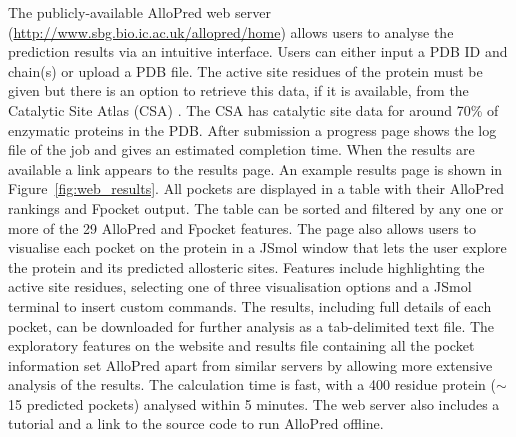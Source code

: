 The publicly-available AlloPred web server (\url{http://www.sbg.bio.ic.ac.uk/allopred/home}) allows users to analyse the prediction results via an intuitive interface.
Users can either input a PDB ID and chain(s) or upload a PDB file.
The active site residues of the protein must be given but there is an option to retrieve this data, if it is available, from the Catalytic Site Atlas (CSA) \cite{Furnham2014}.
The CSA has catalytic site data for around 70\% of enzymatic proteins in the PDB.
After submission a progress page shows the log file of the job and gives an estimated completion time.
When the results are available a link appears to the results page.
An example results page is shown in Figure~\ref{fig:web_results}.
All pockets are displayed in a table with their AlloPred rankings and Fpocket output.
The table can be sorted and filtered by any one or more of the 29 AlloPred and Fpocket features.
The page also allows users to visualise each pocket on the protein in a JSmol window that lets the user explore the protein and its predicted allosteric sites.
Features include highlighting the active site residues, selecting one of three visualisation options and a JSmol terminal to insert custom commands.
The results, including full details of each pocket, can be downloaded for further analysis as a tab-delimited text file.
The exploratory features on the website and results file containing all the pocket information set AlloPred apart from similar servers by allowing more extensive analysis of the results.
The calculation time is fast, with a 400 residue protein ($\sim$15 predicted pockets) analysed within 5 minutes.
The web server also includes a tutorial and a link to the source code to run AlloPred offline.


